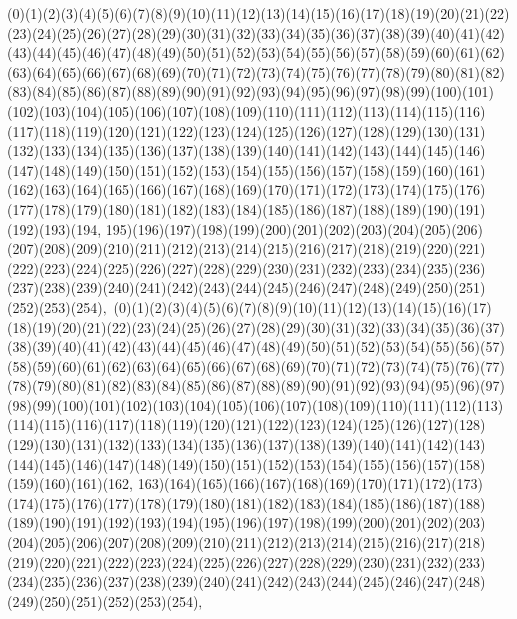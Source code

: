 \documentclass[12pt]{article}
\begin{document}
{(0)(1)(2)(3)(4)(5)(6)(7)(8)(9)(10)(11)(12)(13)(14)(15)(16)(17)(18)(19)(20)(21)(22)(23)(24)(25)(26)(27)(28)(29)(30)(31)(32)(33)(34)(35)(36)(37)(38)(39)(40)(41)(42)(43)(44)(45)(46)(47)(48)(49)(50)(51)(52)(53)(54)(55)(56)(57)(58)(59)(60)(61)(62)(63)(64)(65)(66)(67)(68)(69)(70)(71)(72)(73)(74)(75)(76)(77)(78)(79)(80)(81)(82)(83)(84)(85)(86)(87)(88)(89)(90)(91)(92)(93)(94)(95)(96)(97)(98)(99)(100)(101)(102)(103)(104)(105)(106)(107)(108)(109)(110)(111)(112)(113)(114)(115)(116)(117)(118)(119)(120)(121)(122)(123)(124)(125)(126)(127)(128)(129)(130)(131)(132)(133)(134)(135)(136)(137)(138)(139)(140)(141)(142)(143)(144)(145)(146)(147)(148)(149)(150)(151)(152)(153)(154)(155)(156)(157)(158)(159)(160)(161)(162)(163)(164)(165)(166)(167)(168)(169)(170)(171)(172)(173)(174)(175)(176)(177)(178)(179)(180)(181)(182)(183)(184)(185)(186)(187)(188)(189)(190)(191)(192)(193)(194, 195)(196)(197)(198)(199)(200)(201)(202)(203)(204)(205)(206)(207)(208)(209)(210)(211)(212)(213)(214)(215)(216)(217)(218)(219)(220)(221)(222)(223)(224)(225)(226)(227)(228)(229)(230)(231)(232)(233)(234)(235)(236)(237)(238)(239)(240)(241)(242)(243)(244)(245)(246)(247)(248)(249)(250)(251)(252)(253)(254)$
, 
$
(0)(1)(2)(3)(4)(5)(6)(7)(8)(9)(10)(11)(12)(13)(14)(15)(16)(17)(18)(19)(20)(21)(22)(23)(24)(25)(26)(27)(28)(29)(30)(31)(32)(33)(34)(35)(36)(37)(38)(39)(40)(41)(42)(43)(44)(45)(46)(47)(48)(49)(50)(51)(52)(53)(54)(55)(56)(57)(58)(59)(60)(61)(62)(63)(64)(65)(66)(67)(68)(69)(70)(71)(72)(73)(74)(75)(76)(77)(78)(79)(80)(81)(82)(83)(84)(85)(86)(87)(88)(89)(90)(91)(92)(93)(94)(95)(96)(97)(98)(99)(100)(101)(102)(103)(104)(105)(106)(107)(108)(109)(110)(111)(112)(113)(114)(115)(116)(117)(118)(119)(120)(121)(122)(123)(124)(125)(126)(127)(128)(129)(130)(131)(132)(133)(134)(135)(136)(137)(138)(139)(140)(141)(142)(143)(144)(145)(146)(147)(148)(149)(150)(151)(152)(153)(154)(155)(156)(157)(158)(159)(160)(161)(162, 163)(164)(165)(166)(167)(168)(169)(170)(171)(172)(173)(174)(175)(176)(177)(178)(179)(180)(181)(182)(183)(184)(185)(186)(187)(188)(189)(190)(191)(192)(193)(194)(195)(196)(197)(198)(199)(200)(201)(202)(203)(204)(205)(206)(207)(208)(209)(210)(211)(212)(213)(214)(215)(216)(217)(218)(219)(220)(221)(222)(223)(224)(225)(226)(227)(228)(229)(230)(231)(232)(233)(234)(235)(236)(237)(238)(239)(240)(241)(242)(243)(244)(245)(246)(247)(248)(249)(250)(251)(252)(253)(254)$
, 
$
}
\end{document}
